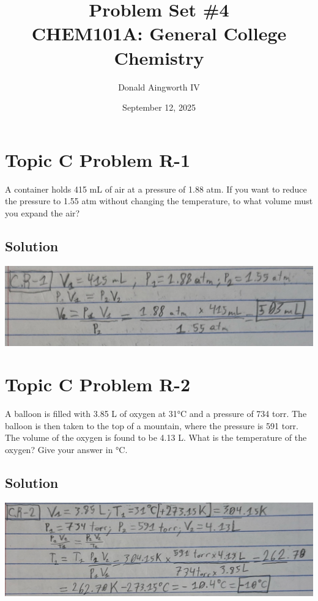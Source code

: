 \documentclass[10pt]{article}
\title{
    Problem Set \#4
    \\  \small
    CHEM101A: General College Chemistry
    }
\author{Donald Aingworth IV}
\date{September 12, 2025}
\begin{document}

    \maketitle

    \pagebreak
    \section{Topic C Problem R-1}
        A container holds 415 mL of air at a pressure of 1.88 atm. 
        If you want to reduce the pressure to 1.55 atm without changing the temperature, to what volume must you expand the air?

        \subsection{Solution}
            \begin{center}
                \includegraphics[width=\textwidth]{Answers Images/answer_C_R-1.jpg}
            \end{center}

    \pagebreak
    \section{Topic C Problem R-2}
        A balloon is filled with 3.85 L of oxygen at 31\unit{\celsius} and a pressure of 734 torr. 
        The balloon is then taken to the top of a mountain, where the pressure is 591 torr. 
        The volume of the oxygen is found to be 4.13 L. What is the temperature of the oxygen? 
        Give your answer in \unit{\celsius}.

        \subsection{Solution}
            \begin{center}
                \includegraphics[width=\textwidth]{Answers Images/answer_C_R-2.jpg}
            \end{center}
\end{document}
